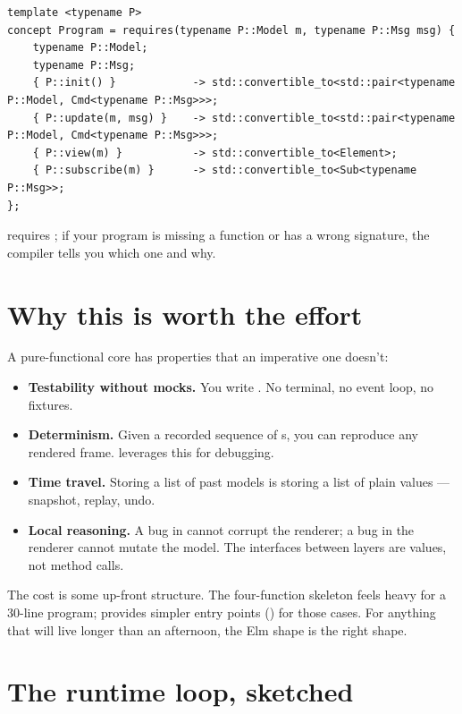\begin{lstlisting}
template <typename P>
concept Program = requires(typename P::Model m, typename P::Msg msg) {
    typename P::Model;
    typename P::Msg;
    { P::init() }            -> std::convertible_to<std::pair<typename P::Model, Cmd<typename P::Msg>>>;
    { P::update(m, msg) }    -> std::convertible_to<std::pair<typename P::Model, Cmd<typename P::Msg>>>;
    { P::view(m) }           -> std::convertible_to<Element>;
    { P::subscribe(m) }      -> std::convertible_to<Sub<typename P::Msg>>;
};
\end{lstlisting}

 requires ; if your program is missing
a function or has a wrong signature, the compiler tells you which one
and why.

\section{Why this is worth the effort}

A pure-functional core has properties that an imperative one doesn't:

\begin{itemize}[leftmargin=*]
  \item \textbf{Testability without mocks.} You write
    . No
    terminal, no event loop, no fixtures.
  \item \textbf{Determinism.} Given a recorded sequence of
    s, you can reproduce any rendered frame. \maya{}
    leverages this for debugging.
  \item \textbf{Time travel.} Storing a list of past models is
    storing a list of plain values --- snapshot, replay, undo.
  \item \textbf{Local reasoning.} A bug in  cannot
    corrupt the renderer; a bug in the renderer cannot mutate the
    model. The interfaces between layers are values, not method
    calls.
\end{itemize}

The cost is some up-front structure. The four-function skeleton feels
heavy for a 30-line program; \maya{} provides simpler entry points
() for those cases. For anything that
will live longer than an afternoon, the Elm shape is the right shape.

\section{The runtime loop, sketched}

